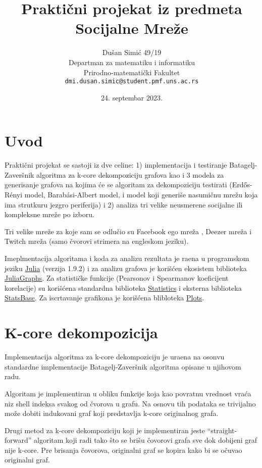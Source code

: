 \documentclass[11pt,a4paper]{article}
\title{Prakti\v cni projekat iz predmeta Socijalne Mreže}
\author{Du\v san Simi\' c 49/19\\
Departman za matematiku i informatiku\\
Prirodno-matematički Fakultet\\
\texttt{dmi.dusan.simic@student.pmf.uns.ac.rs}}
\date{24. septembar 2023.}
\begin{document}
\maketitle

\section{Uvod}

Prakti\v cni projekat se sastoji iz dve celine: 1) implementacija i testiranje Batagelj-Zaver\v snik algoritma za k-core dekompoziciju grafova kao i 3 modela za generisanje grafova na kojima \' ce se algoritam za dekompoziciju testirati (Erd\H os-R\' enyi model, Barab\' asi-Albert model, i model koji generi\v se nasumi\v cnu mre\v zu koja ima strutkuru jezgro periferija) i 2) analiza tri velike neusmerene socijalne ili kompleksne mre\v ze po izboru.

Tri velike mre\v ze za koje sam se odlu\v cio su Facebook ego mre\v za \cite{facebookgraph}, Deezer mre\v za \cite{deezergraph} i Twitch mre\v za \cite{twitchgraph} (samo \v cvorovi strimera na engleskom jeziku).

Imeplmentacija algoritama i koda za analizu rezultata je ra\dj ena u programskom jeziku \href{https://julialang.org/}{Julia} (verzija 1.9.2) i za analizu grafova je kori\v s\' cen ekosistem biblioteka \href{https://juliagraphs.org/}{JuliaGraphs}. Za statisti\v cke funkcije (Pearsonov i Spearmanov koeficijent korelacije) su kori\v s\' cena standardna biblioteka \href{https://docs.julialang.org/en/v1/stdlib/Statistics/}{Statistics} i eksterna biblioteka \href{https://juliastats.org/StatsBase.jl/stable/}{StatsBase}. Za iscrtavanje grafikona je kori\v s\' cena blibloteka \href{https://docs.juliaplots.org/}{Plots}.

\section{K-core dekompozicija}

Implementacija algoritma za k-core dekompoziciju je ura\dj ena na osonvu standardne implementacije Batagelj-Zaver\v snik algoritma \cite{batageljzaversnik2003} opisane u njihovom radu.

Algoritam je implementiran u obliku funkcije koja kao povratnu vrednost vra\' ca niz shell indeksa svakog od \v cvorova u grafu. Na osnovu tih podataka se trivijalno mo\v ze dobiti indukovani graf koji predstavlja k-core originalnog grafa.

Drugi metod za k-core dekompoziciju koji je implementiran jeste ``straight-forward'' algoritam koji radi tako \v sto se bri\v su \v covorovi grafa sve dok dobijeni graf nije k-core. Pre brisanja \v covorova, originalni graf se kopira kako bi se o\v cuvao originalni graf.
\end{document}
